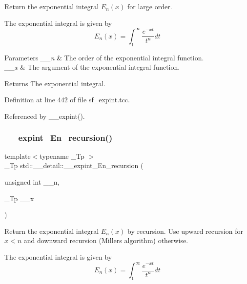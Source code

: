 Return the exponential integral $ E_n(x) $ for large order. 

The exponential integral is given by \[ E_n(x) = \int_{1}^\infty \frac{e^{-xt}}{t^n} dt \]


\begin{DoxyParams}{Parameters}
{\em \+\_\+\+\_\+n} & The order of the exponential integral function. \\
\hline
{\em \+\_\+\+\_\+x} & The argument of the exponential integral function. \\
\hline
\end{DoxyParams}
\begin{DoxyReturn}{Returns}
The exponential integral. 
\end{DoxyReturn}


Definition at line 442 of file sf\+\_\+expint.\+tcc.



Referenced by \+\_\+\+\_\+expint().

\mbox{\label{namespacestd_1_1____detail_a9b0a2050324390fb6c4a584170289a99}} 
\subsubsection{\texorpdfstring{\+\_\+\+\_\+expint\+\_\+\+En\+\_\+recursion()}{\_\_expint\_En\_recursion()}}
{\footnotesize\ttfamily template$<$typename \+\_\+\+Tp $>$ \\
\+\_\+\+Tp std\+::\+\_\+\+\_\+detail\+::\+\_\+\+\_\+expint\+\_\+\+En\+\_\+recursion (\begin{DoxyParamCaption}\item[{unsigned int}]{\+\_\+\+\_\+n,  }\item[{\+\_\+\+Tp}]{\+\_\+\+\_\+x }\end{DoxyParamCaption})}



Return the exponential integral $ E_n(x) $ by recursion. Use upward recursion for $ x < n $ and downward recursion (Miller\textquotesingle{}s algorithm) otherwise. 

The exponential integral is given by \[ E_n(x) = \int_{1}^\infty \frac{e^{-xt}}{t^n} dt \]


